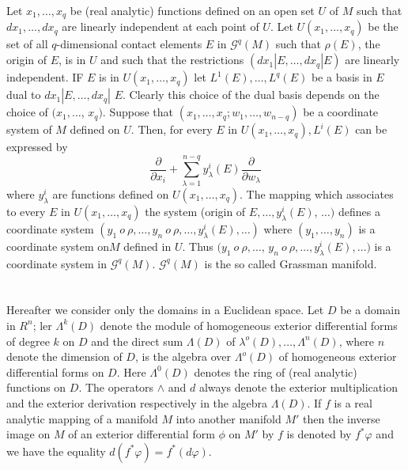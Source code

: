 Let $x_1,  \ldots,  x_q$ be (real analytic) functions defined on an
open set $U$ of $M$ such that $dx_1,  \ldots,  dx_q$ are linearly
independent	at each point of $U$. Let $U (x_1,  \ldots,  x_q)$ be
the set of all $q$-dimensional contact elements $E$ in
$\mathscr{G}^q(M)$ such that $\rho(E)$,  the origin of $E$,  is in $U$
and such that the restrictions $(dx_1 | E,  \ldots,  dx_q | E)$ are
linearly independent. IF $E$ is in $U (x_1,  \ldots,  x_q)$ let $L^1
(E),  \ldots,  L^q (E)$ be a basis in $E$ dual to $dx_1 | E,  \ldots,
dx_q|$ $E$. Clearly this choice of the dual basis depends on the choice
of $(x_1,  \ldots$,  $x_q)$. Suppose that $(x_1,  \ldots,  x_q; w_1,
\ldots,  w_{n-q})$ be a coordinate system of  $M$ defined on
$U$. Then,  for every $E$ in $U (x_1,  \ldots,  x_q),  L^i (E)$ can be
expressed by  
$$
\frac{\partial }{\partial x_i} + \sum_{\lambda =1}^{n-q} y^i_\lambda
(E) \frac{\partial}{\partial w_\lambda} 
$$
where $y^i_\lambda$ are functions defined on $U(x_1,  \ldots,
x_q)$. The mapping which associates to every $E$ in $U(x_1,  \ldots,
x_q)$ the system (origin of $E,  \ldots,  y^i_\lambda (E)$,  $\ldots)$
defines a coordinate system $(y_1 ~ o ~ \rho,  \ldots,  y_n ~ o ~
\rho,  \ldots,  y^i_\lambda (E),  \ldots )$ where $(y_1, \ldots,
y_n)$ is a coordinate system on\pageoriginale $M$ defined in $U$. Thus $(y_1  ~ o ~
\rho,  \ldots$,  $y_n ~ o ~ \rho,  \ldots,  y^i_\lambda (E),  \ldots)$
is a coordinate system in $\mathscr{G}^q (M)$. $\mathscr{G}^q(M)$ is
the so called Grassman manifold. 

\section{}\label{chap2:sec2.2} %

Hereafter we consider only the domains in a Euclidean space. Let $D$
be a domain in $R^n$; ler $\Lambda^k(D)$ denote the module of
homogeneous exterior differential forms of degree $k$ on $D$ and the
direct sum $\Lambda (D) $ of $\lambda^o (D),  \ldots,  \Lambda^n (D)$,
where $n$ denote the dimension of $D$,  is the algebra over $\Lambda^o
(D)$ of homogeneous exterior differential forms on $D$. Here
$\Lambda^0 (D)$ denotes the ring of (real analytic) functions on
$D$. The operators $\wedge$ and $d$ always denote the exterior
multiplication and the exterior derivation respectively in the algebra
$\Lambda (D)$. If $f$ is a real analytic mapping of a manifold $M$
into another manifold $M'$ then the inverse image on $M$ of an
exterior differential form $\phi$ on $M'$ by $f$ is denoted by $f^*
\varphi$ and we have the equality $d(f^* \varphi) = f^* (d
\varphi)$. 

